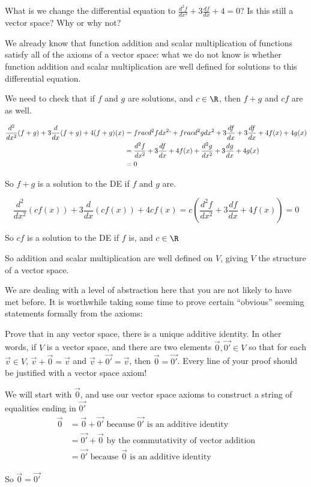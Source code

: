 \documentclass{ximera}
\begin{document}
		What is we change the differential equation to $\frac{d^2f}{dx^2} + 3\frac{df}{dx} +4 = 0$?  Is this still a vector space?  Why or why not?
		\begin{free-response}
			We already know that function addition and scalar multiplication of functions satisfy all of the axioms of a vector space:  what we do not know is whether
			function addition and scalar multiplication are well defined for solutions to this differential equation.  
			
			We need to check that if $f$ and $g$ are solutions, and $c\in \R$, then $f+g$ and $cf$ are as well.
			
			\begin{align*}
				\frac{d^2}{dx^2}(f+g) + 3\frac{d}{dx}(f+g)+4(f+g)(x) &=  frac{d^2f}{dx^2} `+ frac{d^2g}{dx^2} + 3\frac{df}{dx} + 3\frac{df}{dx} +4f(x)+4g(x)\\
				&= \frac{d^2f}{dx^2} + 3\frac{df}{dx} +4f(x) + \frac{d^2g}{dx^2} + 3\frac{dg}{dx} +4g(x) \\
				&= 0
			\end{align*}
			
			So $f+g$ is a solution to the DE if $f$ and $g$ are.
			
			\[ \frac{d^2}{dx^2} (cf(x))+ 3\frac{d}{dx} (cf(x)) +4cf(x) = c(\frac{d^2f}{dx^2} + 3\frac{df}{dx} +4f(x)) = 0\]
			
			So $cf$ is a solution to the DE if $f$ is, and $c\in \R$
			
			So  addition and scalar multiplication are well defined on $V$, giving $V$ the structure of a vector space.
		\end{free-response}
	
	We are dealing with a level of abstraction here that you are not likely to have met before.  It is worthwhile taking some time to prove certain ``obvious'' seeming
	statements formally from the axioms:
	
		Prove that in any vector space, there is a unique additive identity.  In other words, if $V$ is a vector space, and there are two elements $\vec{0},\vec{0'} \in V$ so that for each 
		$\vec{v} \in V$, $\vec{v}+\vec{0}=\vec{v}$ and $\vec{v} + \vec{0'} = \vec{v}$, then $\vec{0}=\vec{0'}$.  Every line of your proof should be justified with a vector space axiom!
		
		\begin{free-response}
			We will start with $\vec{0}$, and use our vector space axioms to construct a string of equalities ending in $\vec{0'}$
			\begin{align*}
				\vec{0} &= \vec{0}+\vec{0'} \text{ because $\vec{0'}$ is an additive identity}\\
					&= \vec{0'}+\vec{0} \text{ by the commutativity of vector addition}\\
					&=\vec{0'}\text{ because $\vec{0}$ is an additive identity}
			\end{align*}
			
			So $\vec{0} = \vec{0'}$
		\end{free-response}	
		
\end{document}

